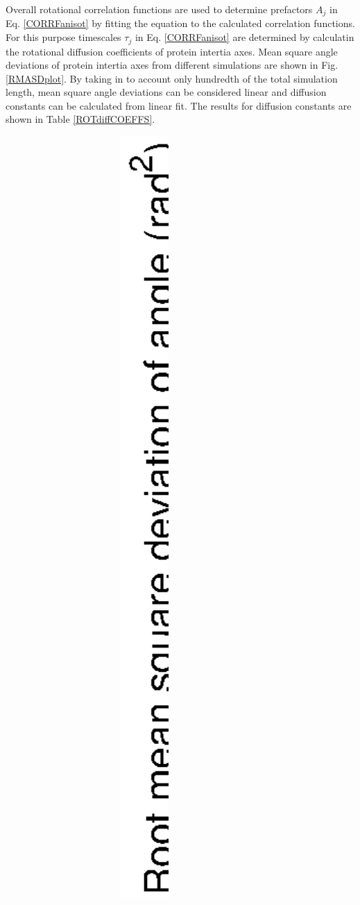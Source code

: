 \documentclass[pre,aps,floatfix,authordate1-4,twocolumn]{revtex4-1}
\begin{document}
Overall rotational correlation functions are used to determine prefactors $A_j$ in Eq. \ref{CORRFanisot}
by fitting the equation to the calculated correlation functions. For this purpose timescales $\tau_j$
in Eq. \ref{CORRFanisot} are determined by calculatin the rotational diffusion coefficients of
protein intertia axes. Mean square angle deviations of protein intertia axes from different simulations
are shown in Fig. \ref{RMASDplot}. By taking in to account only hundredth of the total simulation
length, mean square angle deviations can be considered linear and diffusion constants can be calculated
from linear fit. The results for diffusion constants are shown in Table \ref{ROTdiffCOEFFS}.
\begin{figure}[!h]
  \includegraphics[width=8.5cm]{../Figs/RMASDplot.eps}%

\end{figure}
\end{document}

